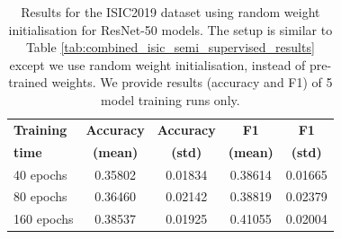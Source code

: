 \documentclass[a4paper,fleqn]{cas-dc}
\begin{document}

\begin{table}[htbp!]
\centering
\begin{tabular}{lcccc}
\toprule
\textbf{Training} & \textbf{Accuracy} & \textbf{Accuracy} & \textbf{F1} & \textbf{F1} \\
\textbf{time} & \textbf{(mean)} & \textbf{(std)} & \textbf{(mean)} & \textbf{(std)} \\ 
\midrule
 40 epochs  & 0.35802 & 0.01834 & 0.38614 & 0.01665 \\
 80 epochs  & 0.36460 & 0.02142 & 0.38819 & 0.02379 \\
 160 epochs & 0.38537 & 0.01925 & 0.41055 & 0.02004 \\
\bottomrule
\end{tabular}
\caption{Results for the ISIC2019 dataset  using random weight initialisation for  ResNet-50 models. The setup is similar to Table \ref{tab:combined_isic_semi_supervised_results} except we use random weight initialisation, instead of pre-trained weights. We provide results (accuracy and F1) of  5 model training runs only.}
\label{tab:random_weights_results}
\end{table}
\end{document}
